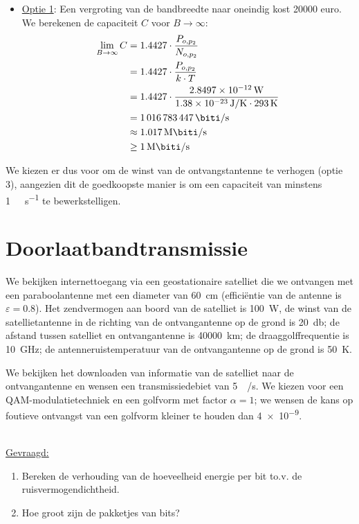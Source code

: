 \documentclass[kulak]{kulakarticle}
\let\epsilon\varepsilon
\begin{document}
\begin{itemize}
		\item \underline{Optie 1}: Een vergroting van de bandbreedte naar oneindig kost 20000 euro. We berekenen de capaciteit \(C\) voor \(B \to \infty\): \begin{align*}
			\lim_{B\to\infty} C &= 1.4427 \cdot \frac{P_{o,p_2}}{N_{o,p_2}}\\
			&= 1.4427 \cdot \frac{P_{o,p_2}}{k \cdot T}\\
			&= 1.4427 \cdot \frac{\SI{2.8497e-12}{\watt}}{\SI{1.38e-23}{\joule/\kelvin}
				 \cdot \SI{293}{\kelvin}}\\
			&= \SI{1016783447}{\biti\per\second}\\
			&\approx \SI{1.017}{\mega\biti\per\second}\\
			&\geq \SI{1}{\mega\biti\per\second}
		\end{align*}
	\end{itemize}

	We kiezen er dus voor om de winst van de ontvangstantenne te verhogen (optie 3), aangezien dit de goedkoopste manier is om een capaciteit van minstens \SI{1}{\mega\biti\per\second} te bewerkstelligen.

	\newpage
	\section{Doorlaatbandtransmissie}

	We bekijken internettoegang via een geostationaire satelliet die we ontvangen met een paraboolantenne met een diameter van \SI{60}{\centi\meter} (efficiëntie van de antenne is \(\epsilon=0.8\)). Het zendvermogen aan boord van de satelliet is \SI{100}{\watt}, de winst van de satellietantenne in de richting van de ontvangantenne op de grond is \SI{20}{\decibel}; de afstand tussen satelliet en ontvangantenne is \SI{40000}{\kilo\meter}; de draaggolffrequentie is \SI{10}{\giga\hertz}; de antenneruistemperatuur van de ontvangantenne op de grond is \SI{50}{\kelvin}.

	We bekijken het downloaden van informatie van de satelliet naar de ontvangantenne en wensen een transmissiedebiet van \SI{5}{\mega\bit/\second}. We kiezen voor een QAM-modulatietechniek en een golfvorm met factor \(\alpha=1\); we wensen de kans op foutieve ontvangst van een golfvorm kleiner te houden dan \SI{4e-9}{}.

	\hfill \\
	\underline{Gevraagd:}
	\begin{enumerate}
		\item Bereken de verhouding van de hoeveelheid energie per bit to.v. de ruisvermogendichtheid.
		\item Hoe groot zijn de pakketjes van bits?
	\end{enumerate}
\end{document}
